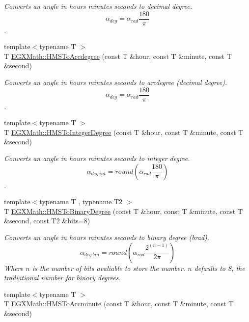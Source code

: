 \begin{DoxyCompactItemize}
\begin{DoxyCompactList}\small\item\em Converts an angle in hours minutes seconds to decimal degree. \[\alpha_{deg}=\alpha_{rad}\frac{180}{\pi}\]. \end{DoxyCompactList}\item 
{\footnotesize template$<$typename T $>$ }\\T \mbox{\hyperlink{group___e_g_x_math-_conversions-_angle_conversions-_h_m_s_gaf4a94d34cb0629049bbcab8775d2af43}{E\+G\+X\+Math\+::\+H\+M\+S\+To\+Arcdegree}} (const T \&hour, const T \&minute, const T \&second)
\begin{DoxyCompactList}\small\item\em Converts an angle in hours minutes seconds to arcdegree (decimal degree). \[\alpha_{deg}=\alpha_{rad}\frac{180}{\pi}\]. \end{DoxyCompactList}\item 
{\footnotesize template$<$typename T $>$ }\\T \mbox{\hyperlink{group___e_g_x_math-_conversions-_angle_conversions-_h_m_s_ga5091437050cc32e29f722a3c50650405}{E\+G\+X\+Math\+::\+H\+M\+S\+To\+Integer\+Degree}} (const T \&hour, const T \&minute, const T \&second)
\begin{DoxyCompactList}\small\item\em Converts an angle in hours minutes seconds to integer degree. \[\alpha_{deg\ int}=round(\alpha_{rad}\frac{180}{\pi})\]. \end{DoxyCompactList}\item 
{\footnotesize template$<$typename T , typename T2 $>$ }\\T \mbox{\hyperlink{group___e_g_x_math-_conversions-_angle_conversions-_h_m_s_gaa8a439d695e8aa75828eeab412a489ca}{E\+G\+X\+Math\+::\+H\+M\+S\+To\+Binary\+Degree}} (const T \&hour, const T \&minute, const T \&second, const T2 \&bits=8)
\begin{DoxyCompactList}\small\item\em Converts an angle in hours minutes seconds to binary degree (brad). \[\alpha_{deg\ bin}=round(\alpha_{rad}\frac{2^{(n-1)}}{2 \pi})\] Where $n$ is the number of bits avaliable to store the number. $n$ defaults to 8, the tradiational number for binary degrees. \end{DoxyCompactList}\item 
{\footnotesize template$<$typename T $>$ }\\T \mbox{\hyperlink{group___e_g_x_math-_conversions-_angle_conversions-_h_m_s_ga36fcb6a59fd8d135346f7ee3d648c2f4}{E\+G\+X\+Math\+::\+H\+M\+S\+To\+Arcminute}} (const T \&hour, const T \&minute, const T \&second)

\end{DoxyCompactItemize}
